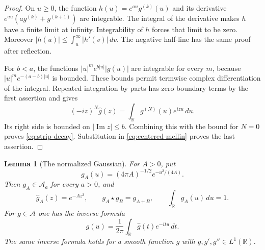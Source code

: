 \documentclass[11pt]{article}
\newtheorem{lemma}[theorem]{Lemma}
\theoremstyle{definition}
\theoremstyle{remark}
\numberwithin{equation}{section}
\newcommand{\R}{\mathbb R}
\newcommand{\A}{\mathcal A}
\begin{document}
\begin{proof}
On $u\geq0$, the function $h(u)=e^{au}g^{(k)}(u)$ and its derivative
$e^{au}(ag^{(k)}+g^{(k+1)})$ are integrable.
The integral of the derivative makes $h$ have a finite limit at infinity.
Integrability of $h$ forces that limit to be zero.
Moreover $|h(u)|\leq\int_u^\infty|h'(v)|\,dv$.
The negative half-line has the same proof after reflection.

For $b<a$, the functions $|u|^m e^{b|u|}|g(u)|$ are integrable for every
$m$, because $|u|^m e^{-(a-b)|u|}$ is bounded.
These bounds permit termwise complex differentiation of the integral.
Repeated integration by parts has zero boundary terms by the first assertion
and gives
\[
 (-iz)^N\widehat g(z)=\int_{\R}g^{(N)}(u)e^{izu}\,du.
\]
Its right side is bounded on $|\operatorname{Im}z|\leq b$.
Combining this with the bound for $N=0$ proves \eqref{eq:strip-decay}.
Substitution in \eqref{eq:centered-mellin} proves the last assertion.
\end{proof}

\begin{lemma}[The normalized Gaussian]
\label{lem:gaussian}
For $A>0$, put
\[
 g_A(u)=(4\pi A)^{-1/2}e^{-u^2/(4A)}.
\]
Then $g_A\in\A_a$ for every $a>0$, and
\begin{equation}
 \widehat g_A(z)=e^{-Az^2},\qquad
 g_A\star g_B=g_{A+B},\qquad \int_{\R}g_A(u)\,du=1.
 \label{eq:gaussian}
\end{equation}
For $g\in\A$ one has the inverse formula
\begin{equation}
 g(u)=\frac1{2\pi}\int_{\R}\widehat g(t)e^{-itu}\,dt.
 \label{eq:inverse}
\end{equation}
The same inverse formula holds for a smooth function $g$ with
$g,g',g''\in L^1(\R)$.
\end{lemma}
\end{document}

